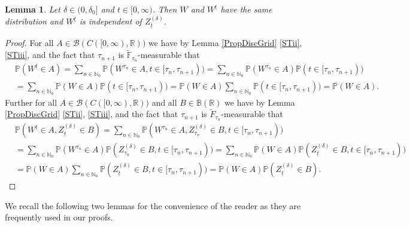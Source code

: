 \documentclass[11pt,a4paper]{article}
\numberwithin{equation}{section}
\newtheorem{lemma}[theorem]{Lemma}
\theoremstyle{definition}
\newcommand{\N}{{\mathbb{N}}}
\renewcommand{\P}{{\mathbb{P}}}
\newcommand{\R}{{\mathbb{R}}}
\begin{document}
\begin{lemma}\label{BMRandomTime}
    Let $\delta\in(0,\delta_0]$ and $t\in[0,\infty)$. Then $W$ and $W^{\underline t}$ have the same distribution and $W^{\underline t}$ is independent of $Z^{(\delta)}_{\underline t}$.
\end{lemma}

\begin{proof}
    For all $A\in\mathcal{B}(C([0,\infty),\R))$ we have by Lemma \ref{PropDiscGrid} \ref{STii}, \ref{STiii}, and the fact that $\tau_{n+1}$ is $\widetilde{\mathbb{F}}_{\tau_n}$-measurable that
    \begin{equation}
        \begin{aligned}
        &\P(W^{\underline t}\in A) 
        = \sum_{n\in\N_0} \P(W^{\tau_n} \in A, t\in[\tau_n, \tau_{n+1}))
        = \sum_{n\in\N_0} \P(W^{\tau_n} \in A) \P( t\in[\tau_n, \tau_{n+1}))\\
        &= \sum_{n\in\N_0} \P(W \in A) \P( t\in[\tau_n, \tau_{n+1}))
        = \P(W \in A) \sum_{n\in\N_0} \P( t\in[\tau_n, \tau_{n+1}))
        = \P(W \in A).
        \end{aligned}
    \end{equation}
    Further for all $A\in\mathcal{B}(C([0,\infty),\R))$ and all $B\in\mathbb{B}(\R)$ we have by Lemma \ref{PropDiscGrid} \ref{STii}, \ref{STiii}, and the fact that $\tau_{n+1}$ is $\widetilde F_{\tau_n}$-measurable that
    \begin{equation}
        \begin{aligned}
        &\P(W^{\underline t}\in A, Z_{\underline t}^{(\delta)}\in B) 
        = \sum_{n\in\N_0} \P(W^{\tau_n} \in A, Z_{\tau_n}^{(\delta)}\in B, t\in[\tau_n, \tau_{n+1}))\\
        &= \sum_{n\in\N_0} \P(W^{\tau_n} \in A)\P(  Z_{\tau_n}^{(\delta)}\in B, t\in[\tau_n, \tau_{n+1}))
        = \sum_{n\in\N_0} \P(W \in A) \P(Z_{\underline t}^{(\delta)}\in B, t\in[\tau_n, \tau_{n+1}))\\
        &= \P(W \in A) \sum_{n\in\N_0} \P(Z_{\underline t}^{(\delta)}\in B, t\in[\tau_n, \tau_{n+1}))
        = \P(W \in A)\P(Z_{\underline t}^{(\delta)}\in B).
        \end{aligned}
    \end{equation}
\end{proof}

We recall the following two lemmas for the convenience of the reader as they are frequently used in our proofs.
\end{document}
